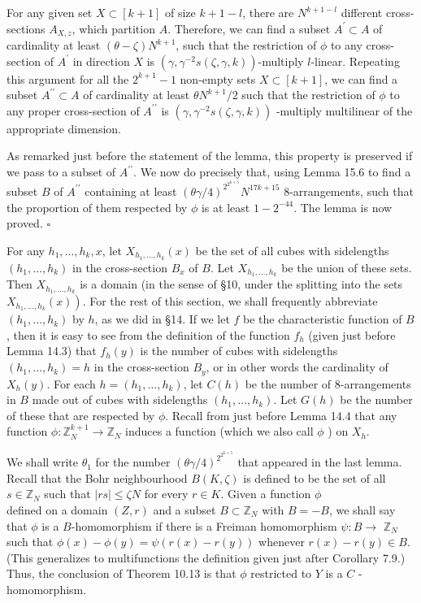 \documentclass[10pt]{article}
\begin{document}
For any given set $X \subset[k+1]$ of size $k+1-l$, there are $N^{k+1-l}$ different cross-sections $A_{X, z}$, which partition $A$. Therefore, we can find a subset $A^{\prime} \subset A$ of cardinality at least $(\theta-\zeta) N^{k+1}$, such that the restriction of $\phi$ to any cross-section of $A^{\prime}$ in direction $X$ is $\left(\gamma, \gamma^{-2} s(\zeta, \gamma, k)\right)$-multiply $l$-linear. Repeating this argument for all the $2^{k+1}-1$ non-empty sets $X \subset[k+1]$, we can find a subset $A^{\prime \prime} \subset A$ of cardinality at least $\theta N^{k+1} / 2$ such that the restriction of $\phi$ to any proper cross-section of $A^{\prime \prime}$ is $\left(\gamma, \gamma^{-2} s(\zeta, \gamma, k)\right)$ -multiply multilinear of the appropriate dimension.

As remarked just before the statement of the lemma, this property is preserved if we pass to a subset of $A^{\prime \prime}$. We now do precisely that, using Lemma 15.6 to find a subset $B$ of $A^{\prime \prime}$ containing at least $(\theta \gamma / 4)^{2^{2^{k+5}}} N^{17 k+15}$ 8-arrangements, such that the proportion of them respected by $\phi$ is at least $1-2^{-44}$. The lemma is now proved. \(\square\)

For any $h_{1}, \ldots, h_{k}, x$, let $X_{h_{1}, \ldots, h_{k}}(x)$ be the set of all cubes with sidelengths $\left(h_{1}, \ldots, h_{k}\right)$ in the cross-section $B_{x}$ of $B$. Let $X_{h_{1}, \ldots, h_{k}}$ be the union of these sets. Then $X_{h_{1}, \ldots, h_{k}}$ is a domain (in the sense of §10, under the splitting into the sets $\left.X_{h_{1}, \ldots, h_{k}}(x)\right)$. For the rest of this section, we shall frequently abbreviate $\left(h_{1}, \ldots, h_{k}\right)$ by $h$, as we did in §14. If we let $f$ be the characteristic function of $B$, then it is easy to see from the definition of the function $f_{h}$ (given just before Lemma 14.3) that $f_{h}(y)$ is the number of cubes with sidelengths $\left(h_{1}, \ldots, h_{k}\right)=h$ in the cross-section $B_{y}$, or in other words the cardinality of $X_{h}(y)$. For each $h=\left(h_{1}, \ldots, h_{k}\right)$, let $C(h)$ be the number of 8-arrangements in $B$ made out of cubes with sidelengths $\left(h_{1}, \ldots, h_{k}\right)$. Let $G(h)$ be the number of these that are respected by $\phi$. Recall from just before Lemma 14.4 that any function $\phi: \mathbb{Z}_{N}^{k+1} \rightarrow \mathbb{Z}_{N}$ induces a function (which we also call $\phi$ ) on $X_{h}$.

We shall write $\theta_{1}$ for the number $(\theta \gamma / 4)^{2^{2^{k+5}}}$ that appeared in the last lemma. Recall that the Bohr neighbourhood $B(K, \zeta)$ is defined to be the set of all $s \in \mathbb{Z}_{N}$ such that $|r s| \leqslant \zeta N$ for every $r \in K$. Given a function $\phi$\\
defined on a domain $(Z, r)$ and a subset $B \subset \mathbb{Z}_{N}$ with $B=-B$, we shall say that $\phi$ is a $B$-homomorphism if there is a Freiman homomorphism $\psi: B \rightarrow$ $\mathbb{Z}_{N}$ such that $\phi(x)-\phi(y)=\psi(r(x)-r(y))$ whenever $r(x)-r(y) \in B$. (This generalizes to multifunctions the definition given just after Corollary 7.9.) Thus, the conclusion of Theorem 10.13 is that $\phi$ restricted to $Y$ is a $C$ -homomorphism.
\end{document}
